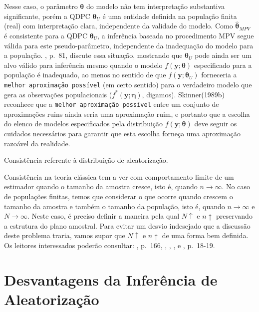 \documentclass[]{book}
\theoremstyle{definition}
\theoremstyle{definition}
\theoremstyle{definition}
\theoremstyle{remark}
\let\BeginKnitrBlock\begin \let\EndKnitrBlock\end
\begin{document}
Nesse caso, o parâmetro \(\mathbf{\theta }\) do modelo não tem
interpretação substantiva significante, porém a QDPC
\(\mathbf{\theta }_{U}\) é uma entidade definida na população finita
(real) com interpretação clara, independente da validade do modelo. Como
\(\mathbf{\hat{\theta}}_{MPV}\) é consistente para a QDPC
\(\mathbf{\theta}_{U}\), a inferência baseada no procedimento MPV segue
válida para este pseudo-parâmetro, independente da inadequação do modelo
para a população. \citep{Sk89b}, p.~81, discute essa situação, mostrando
que \(\mathbf{\theta }_{U}\) pode ainda ser um alvo válido para
inferência mesmo quando o modelo
\(f\left( \mathbf{y};\mathbf{\theta }\right)\) especificado para a
população é inadequado, ao menos no sentido de que
\(f\left( \mathbf{y};\mathbf{\theta}_{U}\right)\) forneceria a
\texttt{melhor\ aproximação\ possível} (em certo sentido) para o
verdadeiro modelo que gera as observações populacionais
(\(f^{*}\left( \mathbf{y};\mathbf{\eta }\right)\), digamos).
Skinner(1989b) reconhece que a \texttt{melhor\ aproximação\ possível}
entre um conjunto de aproximações ruins ainda seria uma aproximação
ruim, e portanto que a escolha do elenco de modelos especificados pela
distribuição \(f\left( \mathbf{y};\mathbf{\theta }\right)\) deve seguir
os cuidados necessários para garantir que esta escolha forneça uma
aproximação razoável da realidade.

\BeginKnitrBlock{remark}
{}Consistência referente à distribuição de
aleatorização.
\EndKnitrBlock{remark}

Consistência na teoria clássica tem a ver com comportamento limite de um
estimador quando o tamanho da amostra cresce, isto é, quando
\(n\rightarrow \infty\). No caso de populações finitas, temos que
considerar o que ocorre quando crescem o tamanho da amostra e também o
tamanho da população, isto é, quando \(n\rightarrow \infty\) e
\(N\rightarrow \infty\). Neste caso, é preciso definir a maneira pela
qual \(N\uparrow\) e \(n\uparrow\) preservando a estrutura do plano
amostral. Para evitar um desvio indesejado que a discussão deste
problema traria, vamos supor que \(N\uparrow\) e \(n\uparrow\) de uma
forma bem definida. Os leitores interessados poderão consultar:
\citep{SSW92}, p.~166, \citep{brewer}, \citep{Isaki}, \citep{Robin},
\citep{hajek} e \citep{SHS89}, p.~18-19.

\section{Desvantagens da Inferência de
Aleatorização}\label{desvantagens-da-inferencia-de-aleatorizacao}
\end{document}
